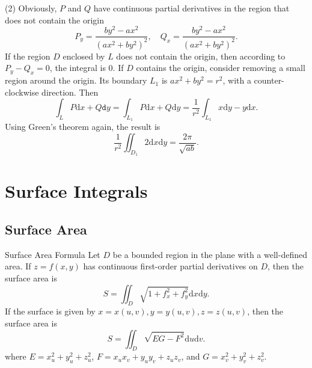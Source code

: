 \begin{solution}
  (2) Obviously, $P$ and $Q$ have continuous partial derivatives in the region
  that does not contain the origin
  \begin{equation}
    P_y = \frac{by^2 - ax^2}{(ax^2 + by^2)^2}, \quad
    Q_x = \frac{by^2 - ax^2}{(ax^2 + by^2)^2}.
  \end{equation}
  If the region $D$ enclosed by $L$ does not contain the origin,
  then according to $P_y - Q_x = 0$, the integral is $0$.
  If $D$ contains the origin, consider removing a small region around the
  origin.
  Its boundary $L_1$ is $ax^2 + by^2 = r^2$, with a counter-clockwise direction.
  Then
  \begin{equation}
    \int_L P \mathrm{d} x + Q \mathtt{d}y
    = \int_{L_1} P\mathrm{d} x + Q\mathrm{d} y
    = \frac{1}{r^2} \int_{L_1} x\mathrm{d} y - y\mathrm{d} x.
  \end{equation}
  Using Green's theorem again, the result is
  \begin{equation}
    \frac{1}{r^2} \iint_{D_1}2\mathrm{d} x \mathrm{d} y = \frac{2\pi}{\sqrt{ab}}.
  \end{equation}
\end{solution}

\section{Surface Integrals}

\subsection{Surface Area}

\begin{proposition}{Surface Area Formula}{}
  Let $D$ be a bounded region in the plane with a well-defined area.
  If $z = f(x, y)$ has continuous first-order partial derivatives on $D$, then
  the surface area is
  \begin{equation}
    S = \iint_D \sqrt{1 + f_x^2 + f_y^2}\mathrm{d} x \mathrm{d} y.
  \end{equation}
  If the surface is given by $x = x(u, v), y = y(u, v), z = z(u, v)$, then
  the surface area is
  \begin{equation}
    S = \iint_D \sqrt{EG - F^2}\mathrm{d} u\mathrm{d}v.
  \end{equation}
  where $E = x_u^2 + y_u^2 + z_u^2$, $F = x_ux_v + y_uy_v + z_uz_v$,
  and $G = x_v^2 + y_v^2 + z_v^2$.
\end{proposition}

